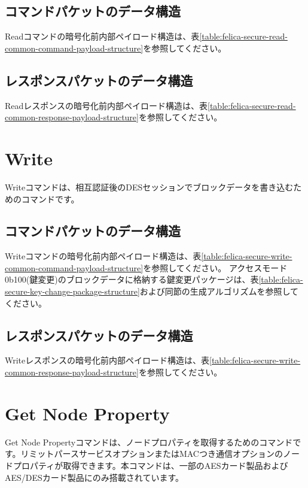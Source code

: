 \documentclass[a4paper]{report}
\begin{document}
\subsection{コマンドパケットのデータ構造}

Readコマンドの暗号化前内部ペイロード構造は、表\ref{table:felica-secure-read-common-command-payload-structure}を参照してください。

\subsection{レスポンスパケットのデータ構造}

Readレスポンスの暗号化前内部ペイロード構造は、表\ref{table:felica-secure-read-common-response-payload-structure}を参照してください。

\section{Write}

Writeコマンドは、相互認証後のDESセッションでブロックデータを書き込むためのコマンドです。

\subsection{コマンドパケットのデータ構造}

Writeコマンドの暗号化前内部ペイロード構造は、表\ref{table:felica-secure-write-common-command-payload-structure}を参照してください。
アクセスモード0b100(鍵変更)のブロックデータに格納する鍵変更パッケージは、表\ref{table:felica-secure-key-change-package-structure}および同節の生成アルゴリズムを参照してください。

\subsection{レスポンスパケットのデータ構造}

Writeレスポンスの暗号化前内部ペイロード構造は、表\ref{table:felica-secure-write-common-response-payload-structure}を参照してください。

\section{Get Node Property}

Get Node Propertyコマンドは、ノードプロパティを取得するためのコマンドです。リミットパースサービスオプションまたはMACつき通信オプションのノードプロパティが取得できます。本コマンドは、一部のAESカード製品およびAES/DESカード製品にのみ搭載されています。
\end{document}
